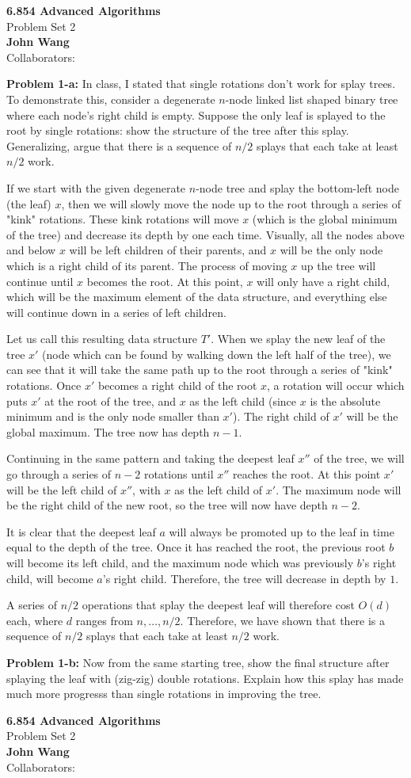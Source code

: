 \documentclass[psamsfonts]{amsart}
\newenvironment{sol}{\vspace{0.25cm}{\large \bfseries Solution:}}{\qedsymbol}
\newenvironment{prob}[1]{\begin{framed}{\large \bfseries Problem #1:}}{\end{framed}}
\newcommand{\makenewtitle}{
\begin{center}
{\huge \bfseries 6.854 Advanced Algorithms} \\
Problem Set 2\\
\vspace{0.25cm}
{\bfseries John Wang} \\
Collaborators:
\end{center}
\vspace{0.5cm}
}
\begin{document}
\makenewtitle
\begin{prob}{1-a}
In class, I stated that single rotations don't work for splay trees. To demonstrate this, consider a degenerate $n$-node linked list shaped binary tree where each node's right child is empty. Suppose the only leaf is splayed to the root by single rotations: show the structure of the tree after this splay. Generalizing, argue that there is a sequence of $n/2$ splays that each take at least $n/2$ work.
\end{prob}

\begin{sol}
If we start with the given degenerate $n$-node tree and splay the bottom-left node (the leaf) $x$, then we will slowly move the node up to the root through a series of "kink" rotations. These kink rotations will move $x$ (which is the global minimum of the tree) and decrease its depth by one each time. Visually, all the nodes above and below $x$ will be left children of their parents, and $x$ will be the only node which is a right child of its parent. The process of moving $x$ up the tree will continue until $x$ becomes the root. At this point, $x$ will only have a right child, which will be the maximum element of the data structure, and everything else will continue down in a series of left children.

Let us call this resulting data structure $T'$. When we splay the new leaf of the tree $x'$ (node which can be found by walking down the left half of the tree), we can see that it will take the same path up to the root through a series of "kink" rotations. Once $x'$ becomes a right child of the root $x$, a rotation will occur which puts $x'$ at the root of the tree, and $x$ as the left child (since $x$ is the absolute minimum and is the only node smaller than $x'$). The right child of $x'$ will be the global maximum. The tree now has depth $n-1$.

Continuing in the same pattern and taking the deepest leaf $x''$ of the tree, we will go through a series of $n-2$ rotations until $x''$ reaches the root. At this point $x'$ will be the left child of $x''$, with $x$ as the left child of $x'$. The maximum node will be the right child of the new root, so the tree will now have depth $n-2$. 

It is clear that the deepest leaf $a$ will always be promoted up to the leaf in time equal to the depth of the tree. Once it has reached the root, the previous root $b$ will become its left child, and the maximum node which was previously $b$'s right child, will become $a$'s right child. Therefore, the tree will decrease in depth by $1$. 

A series of $n/2$ operations that splay the deepest leaf will therefore cost $O(d)$ each, where $d$ ranges from $n, \ldots, n/2$. Therefore, we have shown that there is a sequence of $n/2$ splays that each take at least $n/2$ work.
\end{sol}

\begin{prob}{1-b}
Now from the same starting tree, show the final structure after splaying the leaf with (zig-zig) double rotations. Explain how this splay has made much more progresss than single rotations in improving the tree.
\end{prob}

\begin{sol}

\end{sol}

\newpage

\makenewtitle
\end{document}
